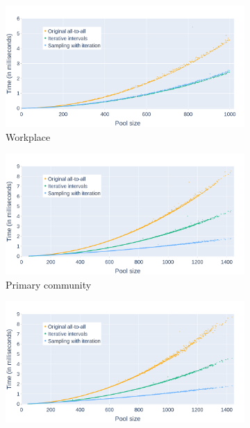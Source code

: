 \begin{figure}
    \centering
    \begin{subfigure}{.8\linewidth}
        \centering
        \includegraphics[width=\textwidth]{4 - Sampling/fig/sampling_with_iteration/times_avg_swi_pType_workplace_full.png}
        \caption{Workplace}
        \label{fig:times_avg_swi_pType_workplace_full}
    \end{subfigure}
    \begin{subfigure}{.8\linewidth}
        \centering
        \includegraphics[width=\textwidth]{4 - Sampling/fig/sampling_with_iteration/times_avg_swi_ptype_primary_full.png}
        \caption{Primary community}
        \label{fig:times_avg_swi_pType_primary_full}
    \end{subfigure}
    \begin{subfigure}{.8\linewidth}
        \centering
        \includegraphics[width=\textwidth]{4 - Sampling/fig/sampling_with_iteration/times_avg_swi_pType_secondary_full.png}

\end{subfigure}
\end{figure}
